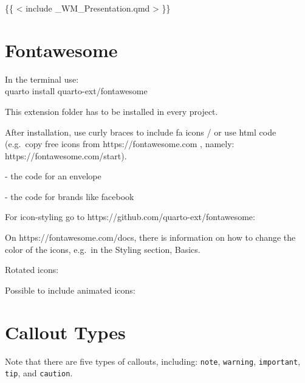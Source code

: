 \documentclass[
  letterpaper,
]{scrbook}
\begin{document}
\{\{ \textless{} include \_WM\_Presentation.qmd \textgreater{} \}\}

\hypertarget{fontawesome}{%
\section{Fontawesome}\label{fontawesome}}

In the terminal use:\\
quarto install quarto-ext/fontawesome

This extension folder has to be installed in every project.

After installation, use curly braces to include fa icons / or use html
code (e.g.~copy free icons from https://fontawesome.com , namely:
https://fontawesome.com/start).

 - the code for an envelope

 - the code for brands like facebook

For icon-styling go to https://github.com/quarto-ext/fontawesome:


On https://fontawesome.com/docs, there is information on how to change
the color of the icons, e.g.~in the Styling section, Basics.

{ }

Rotated icons:

Possible to include animated icons:

\hypertarget{callout-types}{%
\section{Callout Types}\label{callout-types}}

\begin{tcolorbox}[enhanced jigsaw, titlerule=0mm, arc=.35mm, breakable, opacitybacktitle=0.6, title=\textcolor{quarto-callout-note-color}{\faInfo}\hspace{0.5em}{Note}, colframe=quarto-callout-note-color-frame, leftrule=.75mm, rightrule=.15mm, coltitle=black, colbacktitle=quarto-callout-note-color!10!white, bottomtitle=1mm, left=2mm, colback=white, toptitle=1mm, bottomrule=.15mm, toprule=.15mm, opacityback=0]

Note that there are five types of callouts, including: \texttt{note},
\texttt{warning}, \texttt{important}, \texttt{tip}, and
\texttt{caution}.

\end{tcolorbox}
\end{document}
